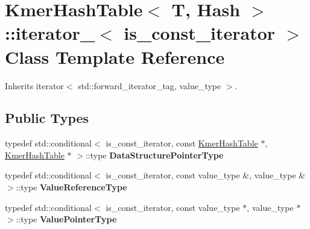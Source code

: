 \hypertarget{classKmerHashTable_1_1iterator__}{}\section{Kmer\+Hash\+Table$<$ T, Hash $>$\+:\+:iterator\+\_\+$<$ is\+\_\+const\+\_\+iterator $>$ Class Template Reference}
\label{classKmerHashTable_1_1iterator__}


Inherits iterator$<$ std\+::forward\+\_\+iterator\+\_\+tag, value\+\_\+type $>$.

\subsection*{Public Types}
\begin{DoxyCompactItemize}
\item 
\mbox{\label{classKmerHashTable_1_1iterator___a7a106512e7a59438235a4b17fae5a214}} 
typedef std\+::conditional$<$ is\+\_\+const\+\_\+iterator, const \hyperlink{structKmerHashTable}{Kmer\+Hash\+Table} $\ast$, \hyperlink{structKmerHashTable}{Kmer\+Hash\+Table} $\ast$ $>$\+::type {\bfseries Data\+Structure\+Pointer\+Type}
\item 
\mbox{\label{classKmerHashTable_1_1iterator___a693428ff381c67a3d1becf382362d044}} 
typedef std\+::conditional$<$ is\+\_\+const\+\_\+iterator, const value\+\_\+type \&, value\+\_\+type \& $>$\+::type {\bfseries Value\+Reference\+Type}
\item 
\mbox{\label{classKmerHashTable_1_1iterator___ae9defeb6c7553af322913522c417edc1}} 
typedef std\+::conditional$<$ is\+\_\+const\+\_\+iterator, const value\+\_\+type $\ast$, value\+\_\+type $\ast$ $>$\+::type {\bfseries Value\+Pointer\+Type}
\end{DoxyCompactItemize}
